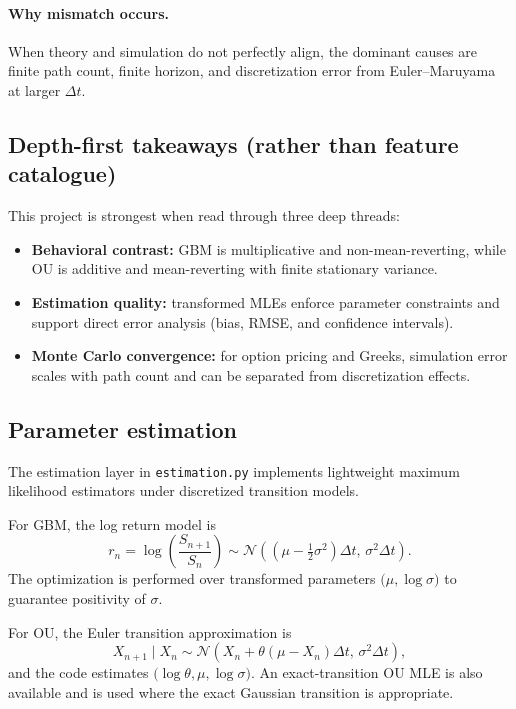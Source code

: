 \documentclass[11pt]{article}
\newcommand{\N}{\mathcal{N}}
\begin{document}
\paragraph{Why mismatch occurs.}
When theory and simulation do not perfectly align, the dominant causes are finite path count, finite horizon, and discretization error from Euler--Maruyama at larger $\Delta t$.

\subsection{Depth-first takeaways (rather than feature catalogue)}

This project is strongest when read through three deep threads:
\begin{itemize}[leftmargin=1.2em]
  \item \textbf{Behavioral contrast:} GBM is multiplicative and non-mean-reverting, while OU is additive and mean-reverting with finite stationary variance.
  \item \textbf{Estimation quality:} transformed MLEs enforce parameter constraints and support direct error analysis (bias, RMSE, and confidence intervals).
  \item \textbf{Monte Carlo convergence:} for option pricing and Greeks, simulation error scales with path count and can be separated from discretization effects.
\end{itemize}

\subsection{Parameter estimation}

The estimation layer in \texttt{estimation.py} implements lightweight maximum likelihood estimators under discretized transition models.

For GBM, the log return model is
\begin{equation}
  r_n = \log\left(\frac{S_{n+1}}{S_n}\right)
  \sim \N\left(\left(\mu - \tfrac{1}{2}\sigma^2\right)\Delta t,\,\sigma^2\Delta t\right).
\end{equation}
The optimization is performed over transformed parameters $\bigl(\mu, \log\sigma\bigr)$ to guarantee positivity of $\sigma$.

For OU, the Euler transition approximation is
\begin{equation}
  X_{n+1}\mid X_n \sim \N\left(X_n + \theta(\mu - X_n)\Delta t,\,\sigma^2\Delta t\right),
\end{equation}
and the code estimates $\bigl(\log\theta, \mu, \log\sigma\bigr)$. An exact-transition OU MLE is also available and is used where the exact Gaussian transition is appropriate.
\end{document}
